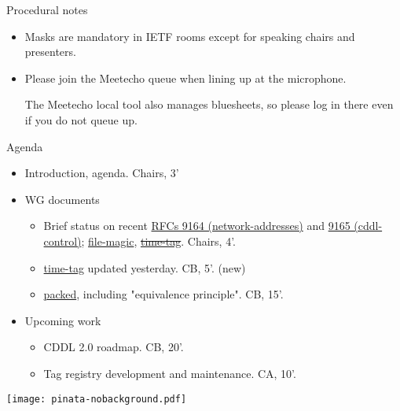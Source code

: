 \documentclass[aspectratio=169]{beamer}
\begin{document}
\begin{frame}{Procedural notes}
    \begin{itemize}
        \item Masks are mandatory in IETF rooms except for speaking chairs and presenters.
        \item Please join the Meetecho queue when lining up at the microphone.

            The Meetecho local tool also manages bluesheets, so please log in there even if you do not queue up.
    \end{itemize}
\end{frame}

\begin{frame}{Agenda}\large
    \begin{itemize}
        \item Introduction, agenda. Chairs, 3'

        \item WG documents
            \begin{itemize}
                \item Brief status on recent \href{https://datatracker.ietf.org/doc/rfc9164/}{RFCs 9164 (network-addresses)} and \href{https://datatracker.ietf.org/doc/rfc9165/}{9165 (cddl-control)}; \href{https://datatracker.ietf.org/doc/draft-ietf-cbor-file-magic/}{file-magic}, \sout{\href{https://datatracker.ietf.org/doc/draft-ietf-cbor-time-tag/}{time-tag}}. Chairs, 4'.
                \item \href{https://datatracker.ietf.org/doc/draft-ietf-cbor-time-tag/}{time-tag} updated yesterday. CB, 5'. (new)
                \item \href{https://datatracker.ietf.org/doc/draft-ietf-cbor-packed/}{packed}, including "equivalence principle". CB, 15'.
            \end{itemize}

            \item Upcoming work
            \begin{itemize}
                \item CDDL 2.0 roadmap. CB, 20'.
                \item Tag registry development and maintenance. CA, 10'.
            \end{itemize}
    \end{itemize}

    \vspace{-3cm}
    \begin{block}{\texttt{[image: pinata-nobackground.pdf]}\mbox{\quad}}
    \end{block}
\end{frame}
\end{document}
